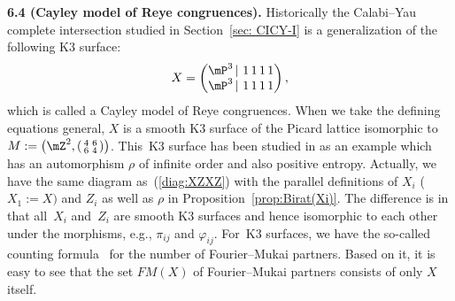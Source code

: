 \documentclass[pdftex]{sigma}
\numberwithin{equation}{section}
\begin{document}
{\bf 6.4 (Cayley model of Reye congruences).} Historically the Calabi--Yau complete intersection studied in Section~\ref{sec: CICY-I} is a generalization of the following K3 surface:
\begin{gather*}
X=\left(\begin{matrix}\mP^{3}\,|\,\,1\,1\,1\,1\\
\mP^{3}\,|\,\,1\,1\,1\,1
\end{matrix}\right),
\end{gather*}
which is called a Cayley model of Reye congruences. When we take the defining equations general, $X$ is a smooth K3 surface of the Picard lattice isomorphic to $M:=\left(\mZ^{2},\left(\begin{smallmatrix}4 & 6\\
6 & 4
\end{smallmatrix}\right)\right)$. This~K3 surface has been studied in \cite{FGvGvL, Oguiso2} as an example which has an automorphism $\rho$ of infinite order and also positive entropy. Actually, we have the same diagram as~(\ref{diag:XZXZ}) with the parallel definitions of $X_{i}$ ($X_{1}:=X)$ and $Z_{i}$ as well as $\rho$ in Proposition~\ref{prop:Birat(Xi)}. The difference is in that all~$X_{i}$ and~$Z_{i}$ are smooth K3 surfaces and hence
isomorphic to each other under the morphisms, e.g., $\pi_{ij}$ and $\varphi_{ij}$. For~K3 surfaces, we have the so-called counting formula~\cite{HLOY} for the number of Fourier--Mukai partners. Based on it, it is easy to see that the set $FM(X)$ of Fourier--Mukai partners consists of only $X$ itself.
\end{document}
